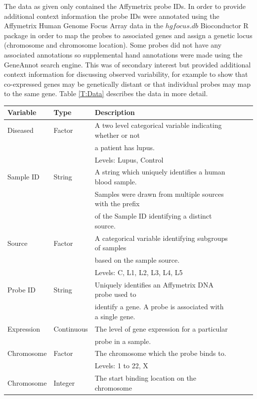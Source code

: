 \documentclass[a4paper, 12pt]{report}
\begin{document}
The data as given only contained the Affymetrix probe IDs. In order to provide additional context information the probe IDs were annotated using the Affymetrix Human Genome Focus Array data in the $hgfocus.db$ \cite{hgfocus.db} Bioconductor R package in order to map the probes to associated genes and assign a genetic locus (chromosome and chromosome location). Some probes did not have any associated annotations so supplemental hand annotations were made using the GeneAnnot\cite{GeneAnnot} search engine. This was of secondary interest but provided additional context information for discussing observed variability, for example to show that co-expressed genes may be genetically distant or that individual probes may map to the same gene. Table \ref{T:Data} describes the data in more detail. 

\begin{table}[ht]
\begin{centering}
\begin{tabular}{llllll}
  \hline
 Variable & Type & Description \\ 
  \hline
Diseased & Factor & A two level categorical variable indicating whether or not \\ 
  & & a patient has lupus.\\
&& Levels: Lupus, Control \\
Sample ID & String & A string which uniquely identifies a human blood sample. \\
 & & Samples were drawn from multiple sources with the prefix \\
&& of the Sample ID identifying a distinct source. \\ 
Source & Factor & A categorical variable identifying subgroups of samples \\
 & & based on the sample source. \\ 
&& Levels: C, L1, L2, L3, L4, L5 \\
Probe ID & String & Uniquely identifies an Affymetrix DNA probe used to \\
  && identify a gene. A probe is associated with a single gene. \\
Expression  & Continuous &  The level of gene expression for a particular \\
&& probe in a sample.\\ 
Chromosome & Factor &  The chromosome which the probe binds to. \\
&& Levels: 1 to 22, X\\
Chromosome & Integer &  The start binding location on the chromosome \\

\end{tabular}
\end{centering}
\end{table}
\end{document}
